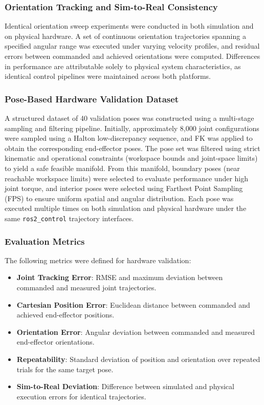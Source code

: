 \documentclass[conference]{IEEEtran}
\begin{document}
	\subsubsection{Orientation Tracking and Sim-to-Real Consistency}
	
	Identical orientation sweep experiments were conducted in both
	simulation and on physical hardware. A set of continuous orientation
	trajectories spanning a specified angular range was executed under
	varying velocity profiles, and residual errors between commanded and
	achieved orientations were computed. Differences in performance are
	attributable solely to physical system characteristics, as identical
	control pipelines were maintained across both platforms.
	
	\subsubsection{Pose-Based Hardware Validation Dataset}
	
	A structured dataset of 40 validation poses was constructed using a
	multi-stage sampling and filtering pipeline. Initially, approximately
	8,000 joint configurations were sampled using a Halton
	low-discrepancy sequence, and FK was applied to obtain the
	corresponding end-effector poses. The pose set was filtered using
	strict kinematic and operational constraints (workspace bounds and
	joint-space limits) to yield a safe feasible manifold. From this
	manifold, boundary poses (near reachable workspace limits) were
	selected to evaluate performance under high joint torque, and interior
	poses were selected using Farthest Point Sampling (FPS) to ensure
	uniform spatial and angular distribution. Each pose was executed
	multiple times on both simulation and physical hardware under the same
	\texttt{ros2\_control} trajectory interfaces.
	
	\subsubsection{Evaluation Metrics}
	
	The following metrics were defined for hardware validation:
	
	\begin{itemize}
		\item \textbf{Joint Tracking Error}: RMSE and maximum deviation
		between commanded and measured joint trajectories.
		\item \textbf{Cartesian Position Error}: Euclidean distance
		between commanded and achieved end-effector positions.
		\item \textbf{Orientation Error}: Angular deviation between
		commanded and measured end-effector orientations.
		\item \textbf{Repeatability}: Standard deviation of position
		and orientation over repeated trials for the same target pose.
		\item \textbf{Sim-to-Real Deviation}: Difference between
		simulated and physical execution errors for identical
		trajectories.
	\end{itemize}
	
\end{document}
